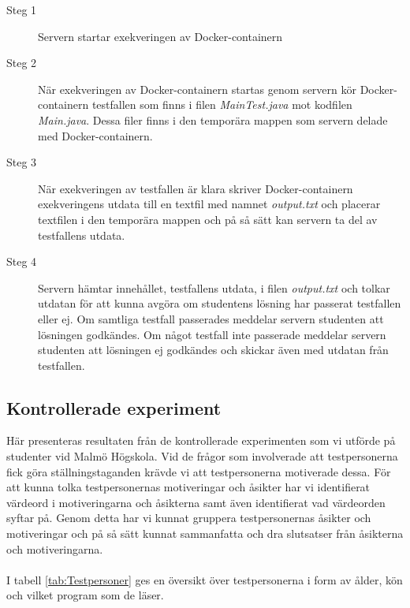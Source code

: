 \documentclass[a4paper,11pt]{article}
\begin{document}
{\begin{description}
    \item [Steg 1] Servern startar exekveringen av Docker-containern
    \item [Steg 2] När exekveringen av Docker-containern startas genom servern kör Docker-containern testfallen som finns i filen \textit{MainTest.java} mot kodfilen \textit{Main.java}. Dessa filer finns i den temporära mappen som servern delade med Docker-containern.
    \item [Steg 3] När exekveringen av testfallen är klara skriver Docker-containern exekveringens utdata till en textfil med namnet \textit{output.txt} och placerar textfilen i den temporära mappen och på så sätt kan servern ta del av testfallens utdata.
    \item [Steg 4] Servern hämtar innehållet, testfallens utdata, i filen \textit{output.txt} och tolkar utdatan för att kunna avgöra om studentens lösning har passerat testfallen eller ej. Om samtliga testfall passerades meddelar servern studenten att lösningen godkändes. Om något testfall inte passerade meddelar servern studenten att lösningen ej godkändes och skickar även med utdatan från testfallen.
\end{description}

\newpage
\subsection{Kontrollerade experiment} \label{experiment}

Här presenteras resultaten från de kontrollerade experimenten som vi utförde på studenter vid Malmö Högskola. Vid de frågor som involverade att testpersonerna fick göra ställningstaganden krävde vi att testpersonerna motiverade dessa. För att kunna tolka testpersonernas motiveringar och åsikter har vi identifierat värdeord i motiveringarna och åsikterna samt även identifierat vad värdeorden syftar på. Genom detta har vi kunnat gruppera testpersonernas åsikter och motiveringar och på så sätt kunnat sammanfatta och dra slutsatser från åsikterna och motiveringarna. 
\\
\\
I tabell \ref{tab:Testpersoner} ges en översikt över testpersonerna i form av ålder, kön och vilket program som de läser.

}
\end{document}
